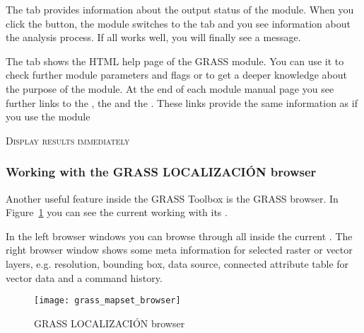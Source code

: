 
The  tab provides information about the output status of the 
module. When you click the  button, the module switches to the 
 tab and you see information about the analysis process. If all 
works well, you will finally see a  message.


The  tab shows the HTML help page of the GRASS module. You can 
use it to check further module parameters and flags or to get a deeper 
knowledge about the purpose of the module. At the end of each module 
manual page you see further links to the , the 
 and the . These links provide 
the same information as if you use the module  

\begin{Tip}\caption{\textsc{Display results immediately}}
\end{Tip} 

\subsubsection{Working with the GRASS LOCALIZACIÓN browser} 

Another useful feature inside the GRASS Toolbox is the GRASS 
 browser. In Figure~\ref{fig:grass_mapset_browser} you 
can see the current working  with its .

In the left browser windows you can browse through all  
inside the current . The right browser window shows some 
meta information for selected raster or vector layers, e.g. resolution, 
bounding box, data source, connected attribute table for vector data and a 
command history.

\begin{figure}[h]
 \begin{center}
 \caption{GRASS LOCALIZACIÓN browser \nixcaption}\label{fig:grass_mapset_browser}
 \texttt{[image: grass\_mapset\_browser]}
 \end{center}
\end{figure}

